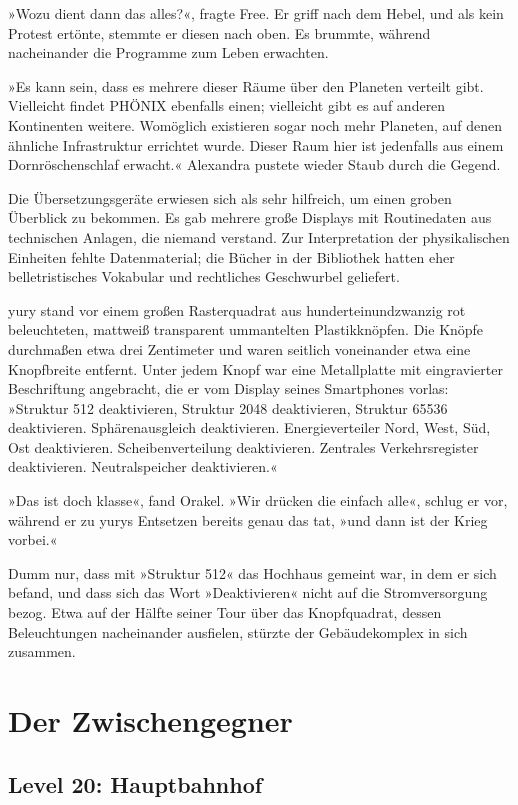 »Wozu dient dann das alles?«, fragte Free. Er griff nach dem Hebel, und als kein Protest ertönte, stemmte er diesen nach oben. Es brummte, während nacheinander die Programme zum Leben erwachten.

»Es kann sein, dass es mehrere dieser Räume über den Planeten verteilt gibt. Vielleicht findet PHÖNIX ebenfalls einen; vielleicht gibt es auf anderen Kontinenten weitere. Womöglich existieren sogar noch mehr Planeten, auf denen ähnliche Infrastruktur errichtet wurde. Dieser Raum hier ist jedenfalls aus einem Dornröschenschlaf erwacht.« Alexandra pustete wieder Staub durch die Gegend.

Die Übersetzungsgeräte erwiesen sich als sehr hilfreich, um einen groben Überblick zu bekommen. Es gab mehrere große Displays mit Routinedaten aus technischen Anlagen, die niemand verstand. Zur Interpretation der physikalischen Einheiten fehlte Datenmaterial; die Bücher in der Bibliothek hatten eher belletristisches Vokabular und rechtliches Geschwurbel geliefert.

yury stand vor einem großen Rasterquadrat aus hunderteinundzwanzig rot beleuchteten, mattweiß transparent ummantelten Plastikknöpfen. Die Knöpfe durchmaßen etwa drei Zentimeter und waren seitlich voneinander etwa eine Knopfbreite entfernt. Unter jedem Knopf war eine Metallplatte mit eingravierter Beschriftung angebracht, die er vom Display seines Smartphones vorlas: »Struktur 512 deaktivieren, Struktur 2048 deaktivieren, Struktur 65536 deaktivieren. Sphärenausgleich deaktivieren. Energieverteiler Nord, West, Süd, Ost deaktivieren. Scheibenverteilung deaktivieren. Zentrales Verkehrsregister deaktivieren. Neutralspeicher deaktivieren.«

»Das ist doch klasse«, fand Orakel. »Wir drücken die einfach alle«, schlug er vor, während er zu yurys Entsetzen bereits genau das tat, »und dann ist der Krieg vorbei.«

Dumm nur, dass mit »Struktur 512« das Hochhaus gemeint war, in dem er sich befand, und dass sich das Wort »Deaktivieren« nicht auf die Stromversorgung bezog. Etwa auf der Hälfte seiner Tour über das Knopfquadrat, dessen Beleuchtungen nacheinander ausfielen, stürzte der Gebäudekomplex in sich zusammen.


\chapter{Der Zwischengegner}

\section{Level 20: Hauptbahnhof}

